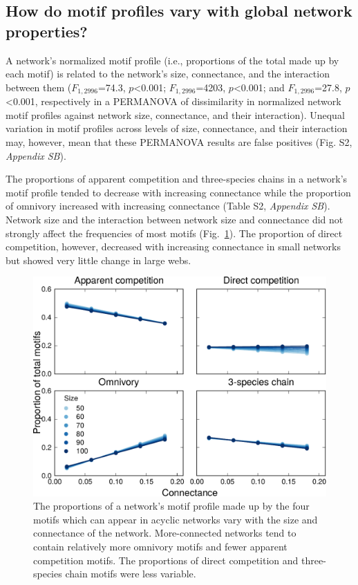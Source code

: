 \documentclass[12pt]{article}
\begin{document}
\begin{spacing}{2.0}
    \subsection*{How do motif profiles vary with global network properties?}

        A network's normalized motif profile (i.e., proportions of the total made up by each motif)
        is related to the network's size, connectance, and the interaction between them ($F_{1,2996}$=74.3, $p$\textless0.001; $F_{1,2996}$=4203, $p$\textless0.001; and $F_{1,2996}$=27.8, $p$\textless0.001, respectively in a PERMANOVA of dissimilarity in normalized network motif profiles against network size, connectance, and their interaction).
        Unequal variation in motif profiles across levels of size, connectance, and their interaction may, however, mean that these PERMANOVA results are false positives (Fig. S2, \emph{Appendix SB}).
        
        
        The proportions of apparent competition and three-species chains in a network's motif profile tended to decrease with increasing connectance while the proportion of omnivory increased with increasing connectance (Table S2, \emph{Appendix SB}). 
        Network size and the interaction between network size and connectance did not strongly affect the frequencies of most motifs (Fig.~\ref{motif_proportion_lms}). The proportion of direct competition, however, decreased with increasing connectance in small networks but showed very little change in large webs.


        \begin{figure}[h!]
            \centering
            \includegraphics[width=.75\textwidth]{manuscript/figures/motif_proportion_lms.pdf}
            \caption{The proportions of a network's motif profile made up by the four motifs which can appear in acyclic networks vary with the size and connectance of the network. More-connected networks tend to contain relatively more omnivory motifs and fewer apparent competition motifs. The proportions of direct competition and three-species chain motifs were less variable.}
            \label{motif_proportion_lms}
        \end{figure}



\end{spacing}
\end{document}
